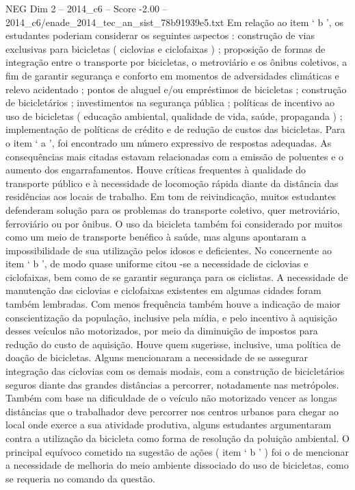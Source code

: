 \begin{textsample}{NEG Dim 2 – 2014\_c6 – Score -2.00 – 2014\_c6/enade\_2014\_tec\_an\_sist\_78b91939e5.txt}
Em relação ao item ‘ b ’, os estudantes poderiam considerar os seguintes aspectos : construção de vias exclusivas para bicicletas ( ciclovias e ciclofaixas ) ; proposição de formas de integração entre o transporte por bicicletas, o metroviário e os ônibus coletivos, a fim de garantir segurança e conforto em momentos de adversidades climáticas e relevo acidentado ; pontos de aluguel e/ou empréstimos de bicicletas ; construção de bicicletários ; investimentos na segurança pública ; políticas de incentivo ao uso de bicicletas ( educação ambiental, qualidade de vida, saúde, propaganda ) ; implementação de políticas de crédito e de redução de custos das bicicletas.
Para o item ‘ a ’, foi encontrado um número expressivo de respostas adequadas.
As consequências mais citadas estavam relacionadas com a emissão de poluentes e o aumento dos engarrafamentos.
Houve críticas frequentes à qualidade do transporte público e à necessidade de locomoção rápida diante da distância das residências aos locais de trabalho.
Em tom de reivindicação, muitos estudantes defenderam solução para os problemas do transporte coletivo, quer metroviário, ferroviário ou por ônibus.
O uso da bicicleta também foi considerado por muitos como um meio de transporte benéfico à saúde, mas alguns apontaram a impossibilidade de sua utilização pelos idosos e deficientes.
No concernente ao item ‘ b ’, de modo quase uniforme citou -se a necessidade de ciclovias e ciclofaixas, bem como de se garantir segurança para os ciclistas.
A necessidade de manutenção das ciclovias e ciclofaixas existentes em algumas cidades foram também lembradas.
Com menos frequência também houve a indicação de maior conscientização da população, inclusive pela mídia, e pelo incentivo à aquisição desses veículos não motorizados, por meio da diminuição de impostos para redução do custo de aquisição.
Houve quem sugerisse, inclusive, uma política de doação de bicicletas.
Alguns mencionaram a necessidade de se assegurar integração das ciclovias com os demais modais, com a construção de bicicletários seguros diante das grandes distâncias a percorrer, notadamente nas metrópoles.
Também com base na dificuldade de o veículo não motorizado vencer as longas distâncias que o trabalhador deve percorrer nos centros urbanos para chegar ao local onde exerce a sua atividade produtiva, alguns estudantes argumentaram contra a utilização da bicicleta como forma de resolução da poluição ambiental.
O principal equívoco cometido na sugestão de ações ( item ‘ b ’ ) foi o de mencionar a necessidade de melhoria do meio ambiente dissociado do uso de bicicletas, como se requeria no comando da questão.

\end{textsample}

